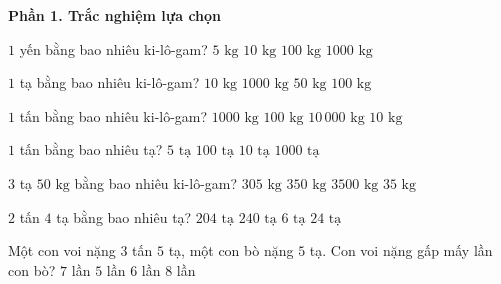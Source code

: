 \textbf{Phần 1. Trắc nghiệm lựa chọn}

\begin{ex} %
$1$ yến bằng bao nhiêu ki-lô-gam?
\choice
{$5\text{ kg}$}
{\True $10\text{ kg}$}
{$100\text{ kg}$}
{$1000\text{ kg}$}
\end{ex}

\begin{ex} %
$1$ tạ bằng bao nhiêu ki-lô-gam?
\choice
{$10\text{ kg}$}
{$1000\text{ kg}$}
{$50\text{ kg}$}
{\True $100\text{ kg}$}
\end{ex}

\begin{ex} %
$1$ tấn bằng bao nhiêu ki-lô-gam?
\choice
{\True $1000\text{ kg}$}
{$100\text{ kg}$}
{$10\,000\text{ kg}$}
{$10\text{ kg}$}
\end{ex}

\begin{ex} %
$1$ tấn bằng bao nhiêu tạ?
\choice
{$5\text{ tạ}$}
{$100\text{ tạ}$}
{\True $10\text{ tạ}$}
{$1000\text{ tạ}$}
\end{ex}

\begin{ex} %
$3$ tạ $50\text{ kg}$ bằng bao nhiêu ki-lô-gam?
\choice
{$305\text{ kg}$}
{\True $350\text{ kg}$}
{$3500\text{ kg}$}
{$35\text{ kg}$}
\end{ex}

\begin{ex} %
$2$ tấn $4$ tạ bằng bao nhiêu tạ?
\choice
{$204\text{ tạ}$}
{$240\text{ tạ}$}
{$6\text{ tạ}$}
{\True $24\text{ tạ}$}
\end{ex}

\begin{ex} %
Một con voi nặng $3$ tấn $5$ tạ, một con bò nặng $5$ tạ. Con voi nặng gấp mấy lần con bò?
\choice
{\True $7$ lần}
{$5$ lần}
{$6$ lần}
{$8$ lần}
\end{ex}

